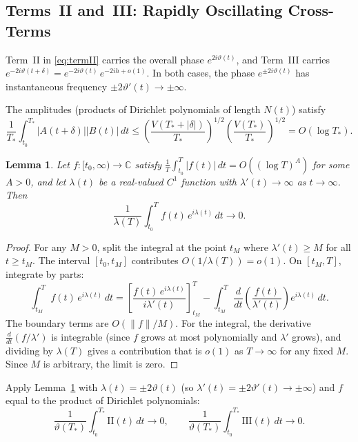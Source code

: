 \documentclass[11pt]{article}
\theoremstyle{plain}
\newtheorem{lemma}[theorem]{Lemma}
\theoremstyle{definition}
\newcommand{\CC}{\mathbb{C}}
\begin{document}
\subsection*{Terms~II and~III: Rapidly Oscillating Cross-Terms}

Term~II in \eqref{eq:termII} carries the overall phase $e^{2i\vartheta(t)}$,
and Term~III carries $e^{-2i\vartheta(t+\delta)}
= e^{-2i\vartheta(t)}\,e^{-2ih+o(1)}$.
In both cases, the phase $e^{\pm 2i\vartheta(t)}$ has instantaneous
frequency $\pm 2\vartheta'(t)\to\pm\infty$.

The amplitudes (products of Dirichlet polynomials of length $N(t)$)
satisfy
\[
\frac{1}{T_*}\int_{t_0}^{T_*}
|A(t+\delta)||B(t)|\,dt
\le
\left(\frac{V(T_*+|\delta|)}{T_*}\right)^{1/2}
\left(\frac{V(T_*)}{T_*}\right)^{1/2}
= O(\log T_*).
\]

\begin{lemma}\label{lem:riemann-lebesgue}
Let $f:[t_0,\infty)\to\CC$ satisfy
$\frac{1}{T}\int_{t_0}^T |f(t)|\,dt = O((\log T)^A)$
for some $A>0$,
and let $\lambda(t)$ be a real-valued $C^1$ function with
$\lambda'(t)\to\infty$ as $t\to\infty$.
Then
\[
\frac{1}{\lambda(T)}\int_{t_0}^T f(t)\,e^{i\lambda(t)}\,dt \to 0.
\]
\end{lemma}

\begin{proof}
For any $M>0$, split the integral at the point $t_M$
where $\lambda'(t)\ge M$ for all $t\ge t_M$.
The interval $[t_0,t_M]$ contributes $O(1/\lambda(T))=o(1)$.
On $[t_M,T]$, integrate by parts:
\[
\int_{t_M}^T f(t)\,e^{i\lambda(t)}\,dt
= \left[\frac{f(t)\,e^{i\lambda(t)}}{i\lambda'(t)}\right]_{t_M}^T
- \int_{t_M}^T \frac{d}{dt}\!\left(\frac{f(t)}{\lambda'(t)}\right)
  e^{i\lambda(t)}\,dt.
\]
The boundary terms are $O(\|f\|/M)$.
For the integral, the derivative
$\frac{d}{dt}(f/\lambda')$ is integrable
(since $f$ grows at most polynomially and $\lambda'$ grows),
and dividing by $\lambda(T)$ gives a contribution that is $o(1)$
as $T\to\infty$ for any fixed $M$.
Since $M$ is arbitrary, the limit is zero.
\end{proof}

Apply Lemma~\ref{lem:riemann-lebesgue} with
$\lambda(t)=\pm 2\vartheta(t)$
(so $\lambda'(t) = \pm 2\vartheta'(t)\to\pm\infty$)
and $f$ equal to the product of Dirichlet polynomials:
\begin{equation}\label{eq:termII-III-vanish}
\frac{1}{\vartheta(T_*)}
\int_{t_0}^{T_*}\mathrm{II}(t)\,dt \to 0,
\qquad
\frac{1}{\vartheta(T_*)}
\int_{t_0}^{T_*}\mathrm{III}(t)\,dt \to 0.
\end{equation}
\end{document}
